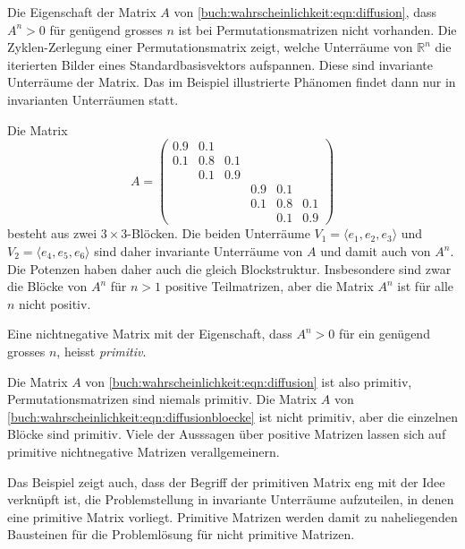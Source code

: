 Die Eigenschaft der Matrix $A$ von
\eqref{buch:wahrscheinlichkeit:eqn:diffusion}, dass $A^n>0$
für genügend grosses $n$ ist bei Permutationsmatrizen nicht
vorhanden.
Die Zyklen-Zerlegung einer Permutationsmatrix zeigt, welche
Unterräume von $\mathbb{R}^n$ die iterierten Bilder eines
Standardbasisvektors aufspannen.
Diese sind invariante Unterräume der Matrix.
Das im Beispiel illustrierte Phänomen findet dann nur in invarianten
Unterräumen statt.

\begin{beispiel}
Die Matrix
\begin{equation}
A=\begin{pmatrix}
0.9&0.1&   &   &   &   \\
0.1&0.8&0.1&   &   &   \\
   &0.1&0.9&   &   &   \\
   &   &   &0.9&0.1&   \\
   &   &   &0.1&0.8&0.1\\
   &   &   &   &0.1&0.9
\end{pmatrix}
\label{buch:wahrscheinlichkeit:eqn:diffusionbloecke}
\end{equation}
besteht aus zwei $3\times 3$-Blöcken.
Die beiden Unterräume $V_1=\langle e_1,e_2,e_3\rangle$
und $V_2=\langle e_4,e_5,e_6\rangle$ sind daher invariante
Unterräume von $A$ und damit auch von $A^n$.
Die Potenzen haben daher auch die gleich Blockstruktur.
Insbesondere sind zwar die Blöcke von $A^n$ für $n>1$ positive
Teilmatrizen, aber die Matrix $A^n$ ist für alle $n$ nicht positiv.
\end{beispiel}

\begin{definition}
Eine nichtnegative Matrix mit der Eigenschaft, dass $A^n>0$ für
ein genügend grosses $n$, heisst {\em primitiv}.
\end{definition}

Die Matrix $A$ von \eqref{buch:wahrscheinlichkeit:eqn:diffusion}
ist also primitiv, Permutationsmatrizen sind niemals primitiv.
Die Matrix $A$ von \eqref{buch:wahrscheinlichkeit:eqn:diffusionbloecke}
ist nicht primitiv, aber die einzelnen Blöcke sind primitiv.
Viele der Ausssagen über positive Matrizen lassen sich auf primitive
nichtnegative Matrizen verallgemeinern.

Das Beispiel zeigt auch, dass der Begriff der primitiven Matrix 
eng mit der Idee verknüpft ist, die Problemstellung in invariante
Unterräume aufzuteilen, in denen eine primitive Matrix vorliegt.
Primitive Matrizen werden damit zu naheliegenden Bausteinen für
die Problemlösung für nicht primitive Matrizen.

